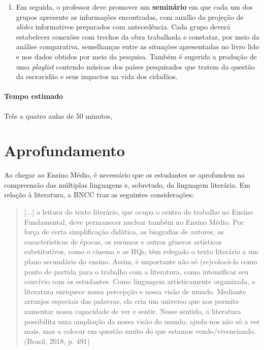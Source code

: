 \documentclass[11pt]{extarticle}
\begin{document}
\begin{enumerate}
\begin{enumerate}
    \item
    Em seguida, o professor deve promover um \textbf{seminário} em
  que cada um dos grupos apresente as informações encontradas, com
  auxílio da projeção de \emph{slides} informativos preparados com
  antecedência. Cada grupo deverá estabelecer conexões com trechos da
  obra trabalhada e constatar, por meio da análise comparativa,
  semelhanças entre as situações apresentadas no livro lido e nos dados
  obtidos por meio da pesquisa. Também é sugerida a produção de uma
  \emph{playlist} contendo músicas dos países pesquisados que tratem 
  da questão da escravidão e seus impactos na vida dos cidadãos.

   \end{enumerate}

 \paragraph{Tempo estimado} Três a quatro aulas de 50 minutos,




\section{Aprofundamento}

Ao chegar ao Ensino Médio, é necessário que os estudantes se aprofundem
na compreensão das múltiplas linguagens e, sobretudo, da linguagem
literária. Em relação à literatura, a BNCC traz as seguintes
considerações:

\begin{quote}
{[}...{]} a leitura do texto literário, que ocupa o centro do trabalho
no Ensino Fundamental, deve permanecer nuclear também no Ensino Médio.
Por força de certa simplificação didática, as biografias de autores, as
características de épocas, os resumos e outros gêneros artísticos
substitutivos, como o cinema e as HQs, têm relegado o texto literário a
um plano secundário do ensino. Assim, é importante não só (re)colocá-lo
como ponto de partida para o trabalho com a literatura, como
intensificar seu convívio com os estudantes. Como linguagem
artisticamente organizada, a literatura enriquece nossa percepção e
nossa visão de mundo. Mediante arranjos especiais das palavras, ela cria
um universo que nos permite aumentar nossa capacidade de ver e sentir.
Nesse sentido, a literatura possibilita uma ampliação da nossa visão do
mundo, ajuda-nos não só a ver mais, mas a colocar em questão muito do
que estamos vendo/vivenciando. (Brasil, 2018, p. 491)
\end{quote}


\end{enumerate}
\end{document}
